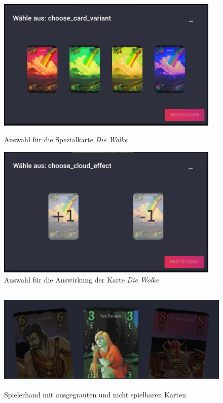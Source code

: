 \begin{figure}[h]
	\begin{minipage}{0.5\textwidth}
		\centering
		\includegraphics[width=0.95\textwidth]{images/cloud-select.png}
		\caption{Auswahl für die Spezialkarte \textit{Die Wolke}}
		\label{fig:cloud-select}
	\end{minipage}
	\begin{minipage}{0.5\textwidth}
		\centering
		\includegraphics[width=0.95\textwidth]{images/cloud-effect.png}
		\caption{Auswahl für die Auswirkung der Karte \textit{Die Wolke}}
		\label{fig:cloud-effect}
	\end{minipage}
\end{figure}

\begin{figure}[h]
	\centering
	\includegraphics[height=5cm]{images/greyed-out.png}
	\caption{Spielerhand mit ausgegrauten und nicht spielbaren Karten}
	\label{fig:greyed-out}
\end{figure}

